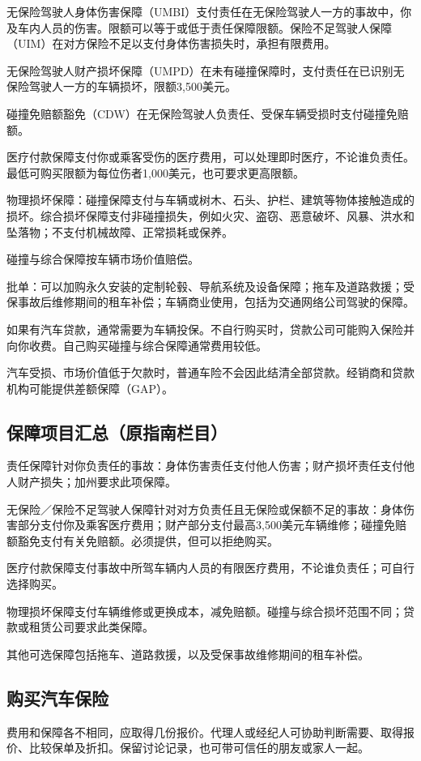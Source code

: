\documentclass[UTF8,fontset=none,11pt,a4paper]{ctexart}
\begin{document}
无保险驾驶人身体伤害保障（UMBI）支付责任在无保险驾驶人一方的事故中，你及车内人员的伤害。限额可以等于或低于责任保障限额。保险不足驾驶人保障（UIM）在对方保险不足以支付身体伤害损失时，承担有限费用。


无保险驾驶人财产损坏保障（UMPD）在未有碰撞保障时，支付责任在已识别无保险驾驶人一方的车辆损坏，限额3,500美元。


碰撞免赔额豁免（CDW）在无保险驾驶人负责任、受保车辆受损时支付碰撞免赔额。


医疗付款保障支付你或乘客受伤的医疗费用，可以处理即时医疗，不论谁负责任。最低可购买限额为每位伤者1,000美元，也可要求更高限额。


物理损坏保障：碰撞保障支付与车辆或树木、石头、护栏、建筑等物体接触造成的损坏。综合损坏保障支付非碰撞损失，例如火灾、盗窃、恶意破坏、风暴、洪水和坠落物；不支付机械故障、正常损耗或保养。


碰撞与综合保障按车辆市场价值赔偿。


批单：可以加购永久安装的定制轮毂、导航系统及设备保障；拖车及道路救援；受保事故后维修期间的租车补偿；车辆商业使用，包括为交通网络公司驾驶的保障。


如果有汽车贷款，通常需要为车辆投保。不自行购买时，贷款公司可能购入保险并向你收费。自己购买碰撞与综合保障通常费用较低。


汽车受损、市场价值低于欠款时，普通车险不会因此结清全部贷款。经销商和贷款机构可能提供差额保障（GAP）。


\subsection*{保障项目汇总（原指南栏目）}
责任保障针对你负责任的事故：身体伤害责任支付他人伤害；财产损坏责任支付他人财产损失；加州要求此项保障。


无保险／保险不足驾驶人保障针对对方负责任且无保险或保额不足的事故：身体伤害部分支付你及乘客医疗费用；财产部分支付最高3,500美元车辆维修；碰撞免赔额豁免支付有关免赔额。必须提供，但可以拒绝购买。


医疗付款保障支付事故中所驾车辆内人员的有限医疗费用，不论谁负责任；可自行选择购买。


物理损坏保障支付车辆维修或更换成本，减免赔额。碰撞与综合损坏范围不同；贷款或租赁公司要求此类保障。


其他可选保障包括拖车、道路救援，以及受保事故维修期间的租车补偿。


\subsection*{购买汽车保险}
费用和保障各不相同，应取得几份报价。代理人或经纪人可协助判断需要、取得报价、比较保单及折扣。保留讨论记录，也可带可信任的朋友或家人一起。
\end{document}
